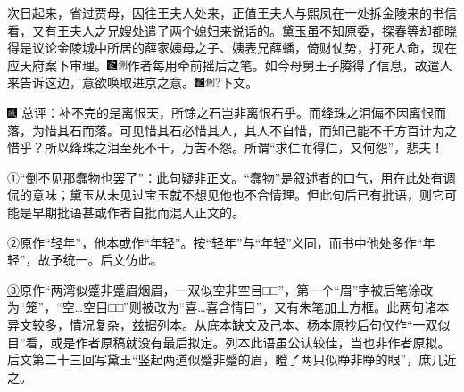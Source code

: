 次日起来，省过贾母，因往王夫人处来，正值王夫人与熙凤在一处拆金陵来的书信看，又有王夫人之兄嫂处遣了两个媳妇来说话的。黛玉虽不知原委，探春等却都晓得是议论金陵城中所居的薛家姨母之子、姨表兄薛蟠，倚财仗势，打死人命，现在应天府案下审理。{\includegraphics[width=3mm]{../Images/00006}\includegraphics[width=3mm]{../Images/00011}\footnotesize \kaishu 作者每用牵前摇后之笔。}如今母舅王子腾得了信息，故遣人来告诉这边，意欲唤取进京之意。{{\includegraphics[width=3mm]{../Images/00006}\includegraphics[width=3mm]{../Images/00011}\footnotesize \kaishu }?{下文。}}

{\includegraphics[width=3mm]{../Images/00005}  \kaishu  总评：补不完的是离恨天，所馀之石岂非离恨石乎。而绛珠之泪偏不因离恨而落，为惜其石而落。可见惜其石必惜其人，其人不自惜，而知己能不千方百计为之惜乎？所以绛珠之泪至死不干，万苦不怨。所谓``求仁而得仁，又何怨''，悲夫！}

{\href{../Text/part0007_split_000.html\#navto_1_a}{①}``倒不见那蠢物也罢了''：此句疑非正文。``蠢物''是叙述者的口气，用在此处有调侃的意味；黛玉从未见过宝玉就不想见他也不合情理。但此句后已有批语，则它可能是早期批语甚或作者自批而混入正文的。}

{\href{../Text/part0007_split_000.html\#navto_2_a}{②}原作``轻年''，他本或作``年轻''。按``轻年''与``年轻''义同，而书中他处多作``年轻''，故予统一。后文仿此。}

{\href{../Text/part0007_split_000.html\#navto_3_a}{③}原作``两湾似蹙非蹙眉烟眉，一双似空非空目□□''，第一个``眉''字被后笔涂改为``笼''，``空\ldots{}空目□□''则被改为``喜\ldots{}喜含情目''，又有朱笔加上方框。此两句诸本异文较多，情况复杂，兹据列本。从底本缺文及己本、杨本原抄后句仅作``一双似目''看，或是作者原稿就没有最后拟定。列本此语虽公认较佳，当也非作者原拟。后文第二十三回写黛玉``竖起两道似蹙非蹙的眉，瞪了两只似睁非睁的眼''，庶几近之。}
